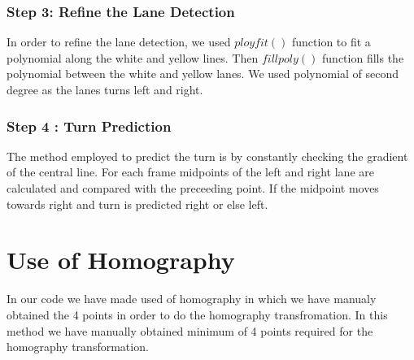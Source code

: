 \documentclass[12pt]{article}
\begin{document}
\subsubsection{Step 3: Reﬁne the Lane Detection }
In order to refine the lane detection, we used $ployfit()$ function to fit a polynomial along the white and yellow lines. Then $fillpoly()$ function fills the polynomial between the white and yellow lanes. We used polynomial of second degree as the lanes turns left and right.

\subsubsection{Step 4 : Turn Prediction }
The method employed to predict the turn is by constantly checking the gradient of the central line. For each frame midpoints of the left and right lane are calculated and compared with the preceeding point. If the midpoint moves towards right and turn is predicted right or else left.

\section{Use of Homography}

In our code we have made used of homography in which we have manualy obtained the 4 points in order to do the homography transfromation. In this method we have manually obtained minimum of 4 points required for the homography transformation.   
\end{document}
